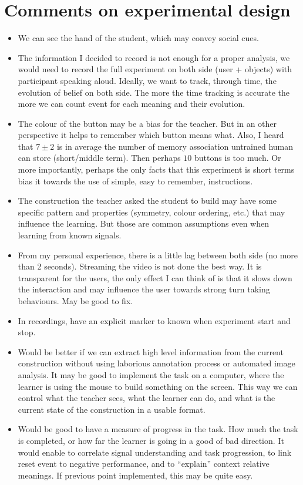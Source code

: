 \section{Comments on experimental design}

\begin{itemize}
    \item We can see the hand of the student, which may convey social cues.
    \item The information I decided to record is not enough for a proper analysis, we would need to record the full experiment on both side (user + objects) with participant speaking aloud. Ideally, we want to track, through time, the evolution of belief on both side. The more the time tracking is accurate the more we can count event for each meaning and their evolution.
    \item The colour of the button may be a bias for the teacher. But in an other perspective it helps to remember which button means what. Also, I heard that $7\pm2$ is in average the number of memory association untrained human can store (short/middle term). Then perhaps $10$ buttons is too much. Or more importantly, perhaps the only facts that this experiment is short terms bias it towards the use of simple, easy to remember, instructions.
    \item The construction the teacher asked the student to build may have some specific pattern and properties (symmetry, colour ordering, etc.) that may influence the learning. But those are common assumptions even when learning from known signals.
    \item From my personal experience, there is a little lag between both side (no more than 2 seconds). Streaming the video is not done the best way. It is transparent for the users, the only effect I can think of is that it slows down the interaction and may influence the user towards strong turn taking behaviours. May be good to fix.
    \item In recordings, have an explicit marker to known when experiment start and stop. 
    \item Would be better if we can extract high level information from the current construction without using laborious annotation process or automated image analysis. It may be good to implement the task on a computer, where the learner is using the mouse to build something on the screen. This way we can control what the teacher sees, what the learner can do, and what is the current state of the construction in a usable format.
    \item Would be good to have a measure of progress in the task. How much the task is completed, or how far the learner is going in a good of bad direction. It would enable to correlate signal understanding and task progression, to link reset event to negative performance, and to ``explain'' context relative meanings. If previous point implemented, this may be quite easy. 

\end{itemize}
